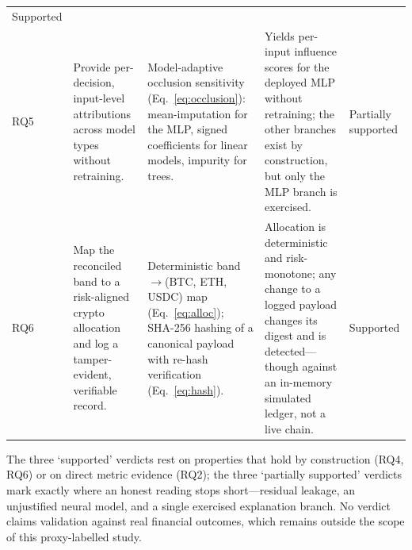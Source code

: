 \begin{table}[t]
\begin{tabularx}{\textwidth}{@{}>{\centering\arraybackslash}p{0.8cm} L L L >{\raggedright\arraybackslash}p{1.9cm}@{}}
Supported \\
\addlinespace
RQ5 & Provide per-decision, input-level attributions across model types without retraining.
&
Model-adaptive occlusion sensitivity (Eq.~\ref{eq:occlusion}): mean-imputation for the MLP,
signed coefficients for linear models, impurity for trees. &
Yields per-input influence scores for the deployed MLP without retraining; the other
branches exist by construction, but only the MLP branch is exercised. &
Partially supported \\
\addlinespace
RQ6 & Map the reconciled band to a risk-aligned crypto allocation and log a tamper-evident,
verifiable record. &
Deterministic band$\rightarrow$(BTC, ETH, USDC) map (Eq.~\ref{eq:alloc}); SHA-256 hashing
of a canonical payload with re-hash verification (Eq.~\ref{eq:hash}). &
Allocation is deterministic and risk-monotone; any change to a logged payload changes its
digest and is detected---though against an in-memory simulated ledger, not a live chain. &
Supported \\
\bottomrule
\end{tabularx}
\par\vspace{3pt}
{\footnotesize\itshape\raggedright The three `supported' verdicts rest on properties that
hold by construction (RQ4, RQ6) or on direct metric evidence (RQ2); the three `partially
supported' verdicts mark exactly where an honest reading stops short---residual leakage, an
unjustified neural model, and a single exercised explanation branch. No verdict claims
validation against real financial outcomes, which remains outside the scope of this
proxy-labelled study.\par}
\end{table}
